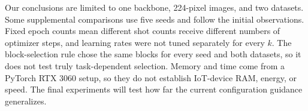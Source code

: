 \documentclass[sigconf,nonacm]{acmart}
\begin{document}
Our conclusions are limited to one backbone, 224-pixel images, and two datasets. Some supplemental comparisons use five seeds and follow the initial observations. Fixed epoch counts mean different shot counts receive different numbers of optimizer steps, and learning rates were not tuned separately for every $k$. The block-selection rule chose the same blocks for every seed and both datasets, so it does not test truly task-dependent selection. Memory and time come from a PyTorch RTX 3060 setup, so they do not establish IoT-device RAM, energy, or speed. The final experiments will test how far the current configuration guidance generalizes.



\end{document}
